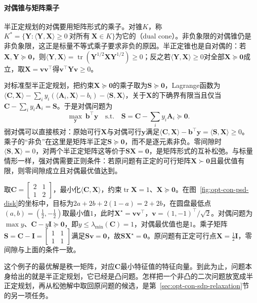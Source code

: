 \paragraph{对偶锥与矩阵乘子}
半正定规划的对偶要用矩阵形式的乘子。对锥$K$，称$K^*=\{\bm Y:\langle\bm Y,\bm X\rangle\geq0\ \text{对所有}\ \bm X\in K\}$为它的（dual cone）。非负象限的对偶锥仍是非负象限，这正是标量不等式乘子要求非负的原因。半正定锥也是自对偶的：若$\bm X,\bm Y\succeq\bm0$，则$\langle\bm Y,\bm X\rangle=\operatorname{tr}(\bm Y^{1/2}\bm X\bm Y^{1/2})\geq0$；反之若$\langle\bm Y,\bm X\rangle\geq0$对全部$\bm X\succeq\bm0$成立，取$\bm X=\bm v\bm v^\top$得$\bm v^\top\bm Y\bm v\geq0$。

对标准型半正定规划，把约束$\bm X\succeq\bm0$的乘子取为$\bm S\succeq\bm0$，Lagrange函数为$\langle\bm C,\bm X\rangle-\sum_iy_i(\langle\bm A_i,\bm X\rangle-b_i)-\langle\bm S,\bm X\rangle$，关于$\bm X$的下确界有限当且仅当$\bm C-\sum_iy_i\bm A_i=\bm S$。于是对偶问题为
\[
  \max_{\bm y}\ \bm b^\top\bm y\quad\text{s.t.}\quad\bm S=\bm C-\sum_iy_i\bm A_i\succeq\bm0.
\]
弱对偶可以直接核对：原始可行$\bm X$与对偶可行$\bm y$满足$\langle\bm C,\bm X\rangle-\bm b^\top\bm y=\langle\bm S,\bm X\rangle\geq0$。乘子的“非负”在这里是矩阵半正定$\bm S\succeq\bm0$，而不是逐元素非负。零间隙时$\langle\bm S,\bm X\rangle=0$，对两个半正定矩阵这等价于$\bm S\bm X=\bm0$，是矩阵形式的互补松弛。与标量情形一样，强对偶需要正则条件：若原问题有正定的可行矩阵$\bm X\succ\bm0$且最优值有限，则零间隙成立且对偶最优值达到。

\begin{example}[最小特征值的半正定规划]
\label{ex:opt-con-sdp-eigen}
取$\bm C=\begin{bmatrix}2&1\\1&2\end{bmatrix}$，最小化$\langle\bm C,\bm X\rangle$，约束$\operatorname{tr}\bm X=1$、$\bm X\succeq\bm0$。在图~\ref{fig:opt-con-psd-disk}的坐标中，目标为$2a+2b+2(1-a)=2+2b$，在圆盘最低点$(a,b)=(\frac12,-\frac12)$取最小值$1$，此时$\bm X^\star=\bm v\bm v^\top$，$\bm v=(1,-1)^\top/\sqrt2$。对偶问题为$\max y$、$\bm C-y\bm I\succeq\bm0$，即$y\leq\lambda_{\min}(\bm C)=1$，对偶最优值也是$1$。乘子矩阵$\bm S=\bm C-\bm I=\begin{bmatrix}1&1\\1&1\end{bmatrix}$满足$\bm S\bm v=\bm0$，故$\bm S\bm X^\star=\bm0$。原问题有正定可行点$\bm X=\frac12\bm I$，零间隙与上面的条件一致。
\end{example}

这个例子的最优解是秩一矩阵，对应$\bm C$最小特征值的特征向量。到此为止，问题本身给出的就是半正定规划，它已经是凸问题。怎样把一个非凸的二次问题放宽成半正定规划，再从松弛解中取回原问题的候选，是第~\ref{sec:opt-con-sdp-relaxation}节的另一项任务。
